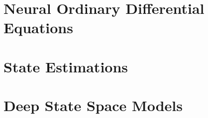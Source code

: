 \chapter{Neural Ordinary Differential Equations}

\chapter{State Estimations}


\chapter{Deep State Space Models}


